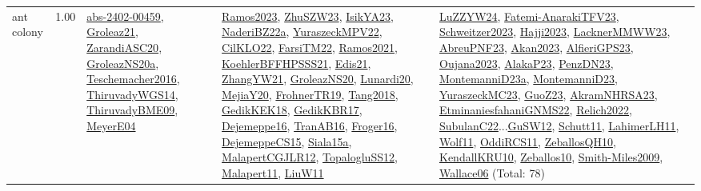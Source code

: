 {\begin{longtable}{p{3cm}r>{\raggedright\arraybackslash}p{6cm}>{\raggedright\arraybackslash}p{6cm}>{\raggedright\arraybackslash}p{8cm}}
\index{ant colony}\index{Algorithms!ant colony}ant colony &  1.00 & \hyperref[detail:abs-2402-00459]{abs-2402-00459}, \hyperref[detail:Groleaz21]{Groleaz21}, \hyperref[detail:ZarandiASC20]{ZarandiASC20}, \hyperref[detail:GroleazNS20a]{GroleazNS20a}, \hyperref[detail:Teschemacher2016]{Teschemacher2016}, \hyperref[detail:ThiruvadyWGS14]{ThiruvadyWGS14}, \hyperref[detail:ThiruvadyBME09]{ThiruvadyBME09}, \hyperref[detail:MeyerE04]{MeyerE04} & \hyperref[detail:Ramos2023]{Ramos2023}, \hyperref[detail:ZhuSZW23]{ZhuSZW23}, \hyperref[detail:IsikYA23]{IsikYA23}, \hyperref[detail:NaderiBZ22a]{NaderiBZ22a}, \hyperref[detail:YuraszeckMPV22]{YuraszeckMPV22}, \hyperref[detail:CilKLO22]{CilKLO22}, \hyperref[detail:FarsiTM22]{FarsiTM22}, \hyperref[detail:Ramos2021]{Ramos2021}, \hyperref[detail:KoehlerBFFHPSSS21]{KoehlerBFFHPSSS21}, \hyperref[detail:Edis21]{Edis21}, \hyperref[detail:ZhangYW21]{ZhangYW21}, \hyperref[detail:GroleazNS20]{GroleazNS20}, \hyperref[detail:Lunardi20]{Lunardi20}, \hyperref[detail:MejiaY20]{MejiaY20}, \hyperref[detail:FrohnerTR19]{FrohnerTR19}, \hyperref[detail:Tang2018]{Tang2018}, \hyperref[detail:GedikKEK18]{GedikKEK18}, \hyperref[detail:GedikKBR17]{GedikKBR17}, \hyperref[detail:Dejemeppe16]{Dejemeppe16}, \hyperref[detail:TranAB16]{TranAB16}, \hyperref[detail:Froger16]{Froger16}, \hyperref[detail:DejemeppeCS15]{DejemeppeCS15}, \hyperref[detail:Siala15a]{Siala15a}, \hyperref[detail:MalapertCGJLR12]{MalapertCGJLR12}, \hyperref[detail:TopalogluSS12]{TopalogluSS12}, \hyperref[detail:Malapert11]{Malapert11}, \hyperref[detail:LiuW11]{LiuW11} & \hyperref[detail:LuZZYW24]{LuZZYW24}, \hyperref[detail:Fatemi-AnarakiTFV23]{Fatemi-AnarakiTFV23}, \hyperref[detail:Schweitzer2023]{Schweitzer2023}, \hyperref[detail:Hajji2023]{Hajji2023}, \hyperref[detail:LacknerMMWW23]{LacknerMMWW23}, \hyperref[detail:AbreuPNF23]{AbreuPNF23}, \hyperref[detail:Akan2023]{Akan2023}, \hyperref[detail:AlfieriGPS23]{AlfieriGPS23}, \hyperref[detail:Oujana2023]{Oujana2023}, \hyperref[detail:AlakaP23]{AlakaP23}, \hyperref[detail:PenzDN23]{PenzDN23}, \hyperref[detail:MontemanniD23a]{MontemanniD23a}, \hyperref[detail:MontemanniD23]{MontemanniD23}, \hyperref[detail:YuraszeckMC23]{YuraszeckMC23}, \hyperref[detail:GuoZ23]{GuoZ23}, \hyperref[detail:AkramNHRSA23]{AkramNHRSA23}, \hyperref[detail:EtminaniesfahaniGNMS22]{EtminaniesfahaniGNMS22}, \hyperref[detail:Relich2022]{Relich2022}, \hyperref[detail:SubulanC22]{SubulanC22}...\hyperref[detail:GuSW12]{GuSW12}, \hyperref[detail:Schutt11]{Schutt11}, \hyperref[detail:LahimerLH11]{LahimerLH11}, \hyperref[detail:Wolf11]{Wolf11}, \hyperref[detail:OddiRCS11]{OddiRCS11}, \hyperref[detail:ZeballosQH10]{ZeballosQH10}, \hyperref[detail:KendallKRU10]{KendallKRU10}, \hyperref[detail:Zeballos10]{Zeballos10}, \hyperref[detail:Smith-Miles2009]{Smith-Miles2009}, \hyperref[detail:Wallace06]{Wallace06} (Total: 78)\\

\end{longtable}}
